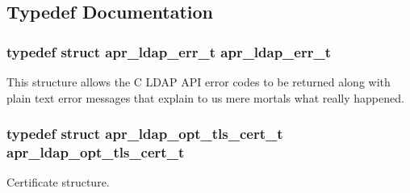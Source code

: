 \subsection{Typedef Documentation}
\hypertarget{group___a_p_r___util___l_d_a_p_ga3f8031b3eb3895e7b5557cd7ddcc9350}{
\subsubsection[{apr\-\_\-ldap\-\_\-err\-\_\-t}]{\setlength{\rightskip}{0pt plus 5cm}typedef struct {\bf apr\-\_\-ldap\-\_\-err\-\_\-t}  {\bf apr\-\_\-ldap\-\_\-err\-\_\-t}}}\label{group___a_p_r___util___l_d_a_p_ga3f8031b3eb3895e7b5557cd7ddcc9350}
This structure allows the C L\-D\-A\-P A\-P\-I error codes to be returned along with plain text error messages that explain to us mere mortals what really happened. \hypertarget{group___a_p_r___util___l_d_a_p_gaf933e3d717b8cf88b72bf45ff3906e24}{
\subsubsection[{apr\-\_\-ldap\-\_\-opt\-\_\-tls\-\_\-cert\-\_\-t}]{\setlength{\rightskip}{0pt plus 5cm}typedef struct {\bf apr\-\_\-ldap\-\_\-opt\-\_\-tls\-\_\-cert\-\_\-t} {\bf apr\-\_\-ldap\-\_\-opt\-\_\-tls\-\_\-cert\-\_\-t}}}\label{group___a_p_r___util___l_d_a_p_gaf933e3d717b8cf88b72bf45ff3906e24}
Certificate structure.

